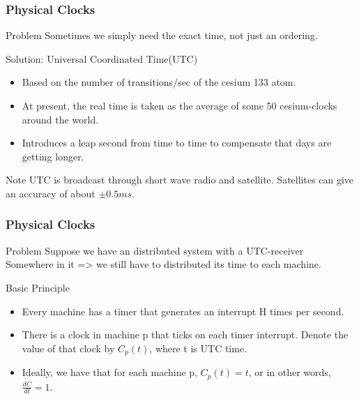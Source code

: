 \begin{frame}
    \frametitle{Physical Clocks}
    \begin{block}{Problem}
        Sometimes we simply need the exact time, not just an ordering.
    \end{block}
    \begin{block}{Solution: Universal Coordinated Time(UTC)}
    \begin{itemize}
        \item Based on the number of transitions/sec of the cesium 133 atom.
        \item At present, the real time is taken as the average of some 50 cesium-clocks around the world.
        \item Introduces a leap second from time to time to compensate that days are getting longer.
    \end{itemize}
    \end{block}
    \begin{block}{Note}
        UTC is broadcast through short wave radio and satellite. Satellites can give an accuracy of about $\pm 0.5 ms$.
    \end{block}
\end{frame}

\begin{frame}
    \frametitle{Physical Clocks}
    \begin{block}{Problem}
        Suppose we have an distributed system with a UTC-receiver \\
        Somewhere in it => we still have to distributed its time to each machine.
    \end{block}
    \begin{block}{Basic Principle}
        \begin{itemize}
            \item Every machine has a timer that generates an interrupt H times per second.
            \item There is a clock in machine p that ticks on each timer interrupt. Denote the value of that clock by $C_p(t)$, where t is UTC time.
            \item Ideally, we have that for each machine p, $C_p(t) = t$, or in other words, $\frac{dC}{dt} = 1$.
        \end{itemize}
    \end{block}
\end{frame}

